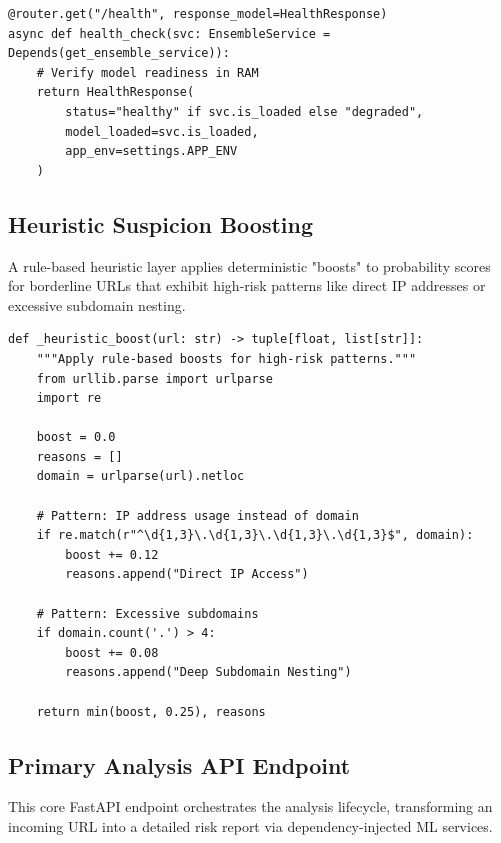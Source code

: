 \begin{listing}[htbp]
\begin{verbatim}
@router.get("/health", response_model=HealthResponse)
async def health_check(svc: EnsembleService = Depends(get_ensemble_service)):
    # Verify model readiness in RAM
    return HealthResponse(
        status="healthy" if svc.is_loaded else "degraded",
        model_loaded=svc.is_loaded,
        app_env=settings.APP_ENV
    )
\end{verbatim}
\caption{Service Health and Readiness Monitoring (predict.py)}
\label{lst:health_check}
\end{listing}



\subsection{Heuristic Suspicion Boosting}
\noindent
A rule-based heuristic layer applies deterministic "boosts" to probability scores for borderline URLs that exhibit high-risk patterns like direct IP addresses or excessive subdomain nesting.

\begin{listing}[htbp]
\begin{verbatim}
def _heuristic_boost(url: str) -> tuple[float, list[str]]:
    """Apply rule-based boosts for high-risk patterns."""
    from urllib.parse import urlparse
    import re
    
    boost = 0.0
    reasons = []
    domain = urlparse(url).netloc
    
    # Pattern: IP address usage instead of domain
    if re.match(r"^\d{1,3}\.\d{1,3}\.\d{1,3}\.\d{1,3}$", domain):
        boost += 0.12
        reasons.append("Direct IP Access")
        
    # Pattern: Excessive subdomains
    if domain.count('.') > 4:
        boost += 0.08
        reasons.append("Deep Subdomain Nesting")
        
    return min(boost, 0.25), reasons
\end{verbatim}
\caption{Heuristic Suspicion Boosting Logic (ensemble\_service.py)}
\label{lst:heuristic_boosting}
\end{listing}


\subsection{Primary Analysis API Endpoint}
\noindent
This core FastAPI endpoint orchestrates the analysis lifecycle, transforming an incoming URL into a detailed risk report via dependency-injected ML services.

